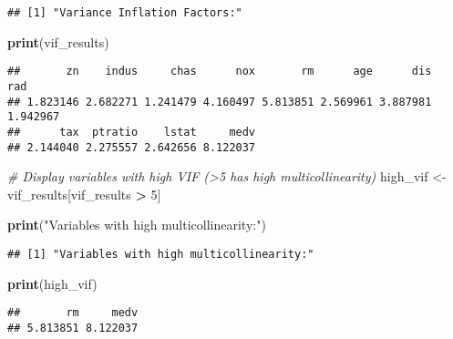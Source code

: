 \documentclass[
]{article}
\newenvironment{Shaded}{\begin{snugshade}}{\end{snugshade}}
\newcommand{\CommentTok}[1]{\textcolor[rgb]{0.56,0.35,0.01}{\textit{#1}}}
\newcommand{\DecValTok}[1]{\textcolor[rgb]{0.00,0.00,0.81}{#1}}
\newcommand{\FunctionTok}[1]{\textcolor[rgb]{0.13,0.29,0.53}{\textbf{#1}}}
\newcommand{\NormalTok}[1]{#1}
\newcommand{\OtherTok}[1]{\textcolor[rgb]{0.56,0.35,0.01}{#1}}
\newcommand{\SpecialCharTok}[1]{\textcolor[rgb]{0.81,0.36,0.00}{\textbf{#1}}}
\newcommand{\StringTok}[1]{\textcolor[rgb]{0.31,0.60,0.02}{#1}}
\begin{document}
\begin{verbatim}
## [1] "Variance Inflation Factors:"
\end{verbatim}

\begin{Shaded}
\begin{Highlighting}[]
\FunctionTok{print}\NormalTok{(vif\_results)}
\end{Highlighting}
\end{Shaded}

\begin{verbatim}
##       zn    indus     chas      nox       rm      age      dis      rad 
## 1.823146 2.682271 1.241479 4.160497 5.813851 2.569961 3.887981 1.942967 
##      tax  ptratio    lstat     medv 
## 2.144040 2.275557 2.642656 8.122037
\end{verbatim}

\begin{Shaded}
\begin{Highlighting}[]
\CommentTok{\# Display variables with high VIF (\textgreater{}5 has high multicollinearity)}
\NormalTok{high\_vif }\OtherTok{\textless{}{-}}\NormalTok{ vif\_results[vif\_results }\SpecialCharTok{\textgreater{}} \DecValTok{5}\NormalTok{]}

\FunctionTok{print}\NormalTok{(}\StringTok{"Variables with high multicollinearity:"}\NormalTok{)}
\end{Highlighting}
\end{Shaded}

\begin{verbatim}
## [1] "Variables with high multicollinearity:"
\end{verbatim}

\begin{Shaded}
\begin{Highlighting}[]
\FunctionTok{print}\NormalTok{(high\_vif)}
\end{Highlighting}
\end{Shaded}

\begin{verbatim}
##       rm     medv 
## 5.813851 8.122037
\end{verbatim}
\end{document}
